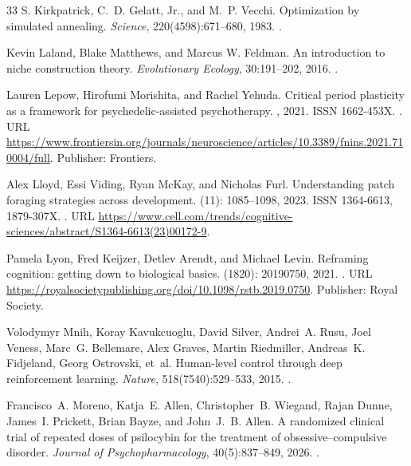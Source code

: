 \documentclass[12pt,fleqn]{article}
\begin{document}
\begin{thebibliography}{33}
  S. Kirkpatrick, C.~D. Gelatt, Jr., and M.~P. Vecchi.
  \newblock Optimization by simulated annealing.
  \newblock \emph{Science}, 220(4598):671--680, 1983.
  \newblock {}.

  Kevin Laland, Blake Matthews, and Marcus W. Feldman.
  \newblock An introduction to niche construction theory.
  \newblock \emph{Evolutionary Ecology}, 30:191--202, 2016.
  \newblock {}.

  Lauren Lepow, Hirofumi Morishita, and Rachel Yehuda.
  \newblock Critical period plasticity as a framework for psychedelic-assisted
  psychotherapy.
  , 2021.
  \newblock ISSN 1662-453X.
  \newblock {}.
  \newblock URL
  \url{https://www.frontiersin.org/journals/neuroscience/articles/10.3389/fnins.2021.710004/full}.
  \newblock Publisher: Frontiers.

  Alex Lloyd, Essi Viding, Ryan McKay, and Nicholas Furl.
  \newblock Understanding patch foraging strategies across development.
   (11): 1085--1098, 2023.
  \newblock ISSN 1364-6613, 1879-307X.
  \newblock {}.
  \newblock URL
  \url{https://www.cell.com/trends/cognitive-sciences/abstract/S1364-6613(23)00172-9}.

  Pamela Lyon, Fred Keijzer, Detlev Arendt, and Michael Levin.
  \newblock Reframing cognition: getting down to biological basics.
   (1820): 20190750, 2021.
  \newblock {}.
  \newblock URL
  \url{https://royalsocietypublishing.org/doi/10.1098/rstb.2019.0750}.
  \newblock Publisher: Royal Society.

  Volodymyr Mnih, Koray Kavukcuoglu, David Silver, Andrei~A. Rusu, Joel Veness,
  Marc~G. Bellemare, Alex Graves, Martin Riedmiller, Andreas~K. Fidjeland,
  Georg Ostrovski, et~al.
  \newblock Human-level control through deep reinforcement learning.
  \newblock \emph{Nature}, 518(7540):529--533, 2015.
  \newblock {}.

  Francisco~A. Moreno, Katja~E. Allen, Christopher~B. Wiegand, Rajan Dunne,
  James~I. Prickett, Brian Bayze, and John~J.~B. Allen.
  \newblock A randomized clinical trial of repeated doses of psilocybin for
  the treatment of obsessive--compulsive disorder.
  \newblock \emph{Journal of Psychopharmacology}, 40(5):837--849, 2026.
  \newblock {}.


\end{thebibliography}
\end{document}
